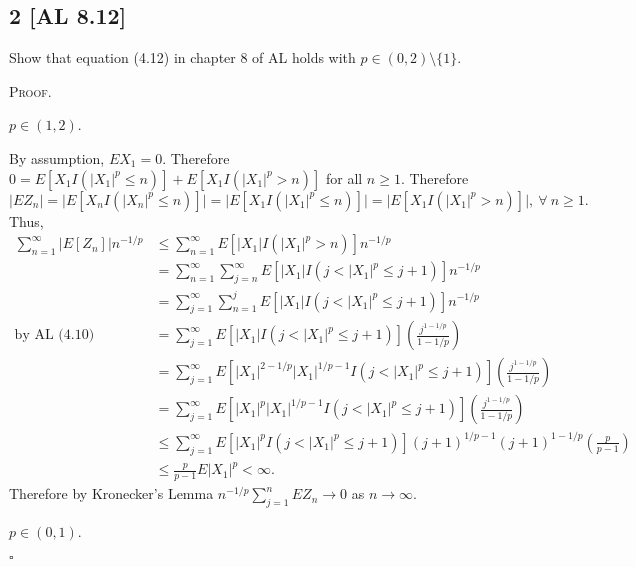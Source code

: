 \documentclass[12pt]{article}
\newcounter{ProofCounter}
\newenvironment{Proof}{\stepcounter{ProofCounter}\textsc{Proof.}}{\hfill$\square$}
\begin{document}
\newpage 
\subsection*{2 [AL 8.12]}
\begin{tcolorbox}
Show that equation (4.12) in chapter 8 of AL holds with $p \in (0,2) \setminus \{1\}$.
\end{tcolorbox}
\begin{Proof}
\begin{description}[leftmargin=4mm]
\item[Case 1:] $p \in (1,2)$.

By assumption, $EX_{1} = 0$. Therefore $0 = E[X_{1}I(|X_{1}|^{p} \leq n)] + E[X_{1}I(|X_{1}|^{p} > n)]$ for all $n \geq 1$. Therefore 
\[ |EZ_{n}| = \big|E[X_{n}I(|X_{n}|^{p} \leq n)]\big| = \big|E[X_{1}I(|X_{1}|^{p} \leq n)]\big| = \big|E[X_{1}I(|X_{1}|^{p} > n)]\big|, \ \forall \ n \geq 1. \]
Thus,
\begin{align*}
\sum_{n=1}^{\infty}|E[Z_{n}]|n^{-1/p} & \leq \sum_{n=1}^{\infty}E\left[ |X_{1}|I(|X_{1}|^{p} > n) \right]n^{-1/p} \\
& = \sum_{n=1}^{\infty}\sum_{j=n}^{\infty} E\left[ |X_{1}|I(j < |X_{1}|^{p} \leq j+1) \right]n^{-1/p} \\
& = \sum_{j=1}^{\infty}\sum_{n=1}^{j}E\left[ |X_{1}|I(j < |X_{1}|^{p} \leq j + 1) \right]n^{-1/p} \\
\text{by AL (4.10) } & = \sum_{j=1}^{\infty}E\left[ |X_{1}|I(j < |X_{1}|^{p} \leq j + 1) \right]\left( \frac{j^{1-1/p}}{1-1/p} \right) \\
& = \sum_{j=1}^{\infty}E\left[ |X_{1}|^{2-1/p}|X_{1}|^{1/p-1}I(j < |X_{1}|^{p} \leq j + 1) \right]\left( \frac{j^{1-1/p}}{1-1/p} \right) \\
& = \sum_{j=1}^{\infty}E\left[ |X_{1}|^{p}|X_{1}|^{1/p-1}I(j < |X_{1}|^{p} \leq j + 1) \right]\left( \frac{j^{1-1/p}}{1-1/p} \right) \\
& \leq \sum_{j=1}^{\infty}E\left[ |X_{1}|^{p}I(j < |X_{1}|^{p} \leq j + 1) \right](j+1)^{1/p - 1}(j+1)^{1-1/p}\left( \frac{p}{p-1} \right) \\
& \leq \frac{p}{p-1}E|X_{1}|^{p} < \infty.
\end{align*}
Therefore by Kronecker's Lemma $n^{-1/p}\sum_{j=1}^{n}EZ_{n} \rightarrow 0$ as $n \rightarrow \infty$.

\item[Case 2:] $p \in (0,1)$.


\end{description}
\end{Proof}
\end{document}
